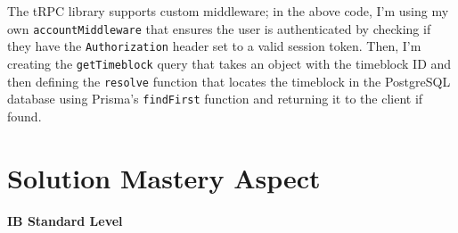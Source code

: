 \documentclass[notitlepage, 12pt]{report}
\newcommand{\code}[1]{\texttt{#1}}
\begin{document}
\begin{sloppypar}
	The tRPC library supports custom middleware; in the above code, I'm using my own \code{accountMiddleware} that ensures the user is authenticated by checking if they have the \code{Authorization} header set to a valid session token. Then, I'm creating the \code{getTimeblock} query that takes an object with the timeblock ID and then defining the \code{resolve} function that locates the timeblock in the PostgreSQL database using Prisma's \code{findFirst} function and returning it to the client if found.
\end{sloppypar}

\newpage

\def\arraystretch{1.3}
\section*{Solution Mastery Aspect}
\textbf{IB Standard Level}
\vspace{-6pt}
\end{document}
